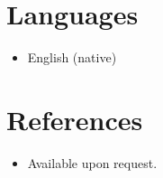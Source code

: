 \documentclass[11pt,a4paper,sans]{moderncv}
\begin{document}
\section{Languages}
\vspace{1pt}
\begin{itemize}
\item English (native)
\end{itemize}

\section{References}
\vspace{1pt}
\begin{itemize}
\item{Available upon request.}
\end{itemize}
\end{document}
